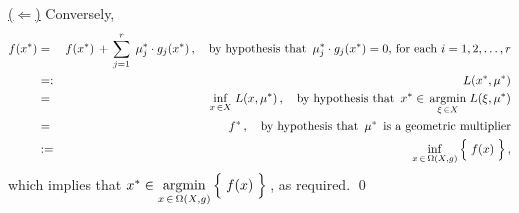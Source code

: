 \vskip 0.3cm
\noindent
\underline{($\Longleftarrow$)}
\quad
Conversely,
\begin{eqnarray*}
f(x^{*})
& = &
	f(x^{*}) \,+\, \overset{r}{\underset{j=1}{\sum}}\;\,\mu_{j}^{*} \cdot g_{j}(x^{*})\,,
	\quad\textnormal{by hypothesis that \,$\mu_{j}^{*}\cdot g_{j}(x^{*}) = 0$, for each $i = 1,2,\ldots,r$}
\\
& =: &
	L(x^{*},\mu^{*})
\\
& = &
	\underset{x\,\in X}{\inf}\;L(x,\mu^{*})\,,
	\quad\textnormal{by hypothesis that \,$x^{*} \in\, \underset{\xi\,\in X}{\argmin}\;L(\xi,\mu^{*})$}
\\
& = &
	f^{*}\,,
	\quad\textnormal{by hypothesis that \,$\mu^{*}$\, is a geometric multiplier}
\\
& := &
	\underset{x\,\in\,\Omega(X,g)}{\inf}\left\{\;
		\overset{{\color{white}.}}{f(x)}
		\;\right\},
\end{eqnarray*}
which implies that
$x^{*} \in \underset{x\,\in\,\Omega(X,g)}{\argmin}\left\{\;\overset{{\color{white}.}}{f(x)}\;\right\}$\,,
as required.
\qed

